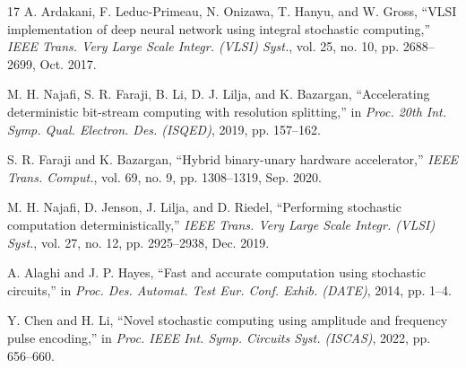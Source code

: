 \documentclass{solitairemiya-art}
\begin{document}
\begin{thebibliography}{17}
A. Ardakani, F. Leduc-Primeau, N. Onizawa, T. Hanyu, and W. Gross, ``VLSI implementation of deep neural network using integral stochastic computing,'' \textit{IEEE Trans. Very Large Scale Integr. (VLSI) Syst.}, vol. 25, no. 10, pp. 2688--2699, Oct. 2017.

M. H. Najafi, S. R. Faraji, B. Li, D. J. Lilja, and K. Bazargan, ``Accelerating deterministic bit-stream computing with resolution splitting,'' in \textit{Proc. 20th Int. Symp. Qual. Electron. Des. (ISQED)}, 2019, pp. 157--162.

S. R. Faraji and K. Bazargan, ``Hybrid binary-unary hardware accelerator,'' \textit{IEEE Trans. Comput.}, vol. 69, no. 9, pp. 1308--1319, Sep. 2020.

M. H. Najafi, D. Jenson, J. Lilja, and D. Riedel, ``Performing stochastic computation deterministically,'' \textit{IEEE Trans. Very Large Scale Integr. (VLSI) Syst.}, vol. 27, no. 12, pp. 2925--2938, Dec. 2019.

A. Alaghi and J. P. Hayes, ``Fast and accurate computation using stochastic circuits,'' in \textit{Proc. Des. Automat. Test Eur. Conf. Exhib. (DATE)}, 2014, pp. 1--4.

Y. Chen and H. Li, ``Novel stochastic computing using amplitude and frequency pulse encoding,'' in \textit{Proc. IEEE Int. Symp. Circuits Syst. (ISCAS)}, 2022, pp. 656--660.

\end{thebibliography}
\end{document}
